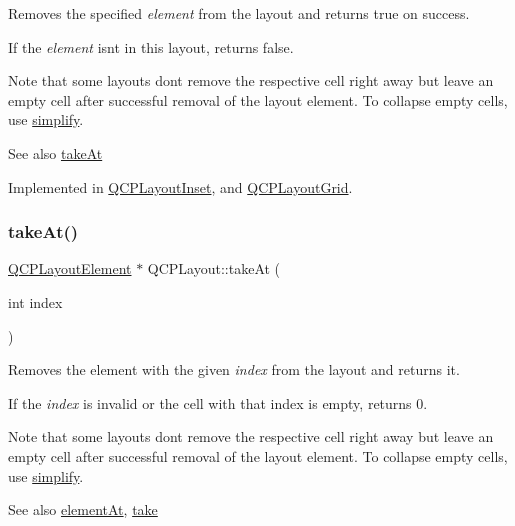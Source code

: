 Removes the specified {\itshape element} from the layout and returns true on success.

If the {\itshape element} isn\textquotesingle{}t in this layout, returns false.

Note that some layouts don\textquotesingle{}t remove the respective cell right away but leave an empty cell after successful removal of the layout element. To collapse empty cells, use \hyperlink{class_q_c_p_layout_a41e6ac049143866e8f8b4964efab01b2}{simplify}.

\begin{DoxySeeAlso}{See also}
\hyperlink{class_q_c_p_layout_a5a79621fa0a6eabb8b520cfc04fb601a}{take\+At} 
\end{DoxySeeAlso}


Implemented in \hyperlink{class_q_c_p_layout_inset_a9ac707ccff650633b97f52dd5cddcf49}{Q\+C\+P\+Layout\+Inset}, and \hyperlink{class_q_c_p_layout_grid_a666a9fe9e92054436f9b66eba25cca0c}{Q\+C\+P\+Layout\+Grid}.

\mbox{\label{class_q_c_p_layout_a5a79621fa0a6eabb8b520cfc04fb601a}} 
\subsubsection{\texorpdfstring{take\+At()}{takeAt()}}
{\footnotesize\ttfamily \hyperlink{class_q_c_p_layout_element}{Q\+C\+P\+Layout\+Element} $\ast$ Q\+C\+P\+Layout\+::take\+At (\begin{DoxyParamCaption}\item[{int}]{index }\end{DoxyParamCaption})\hspace{0.3cm}{\ttfamily [pure virtual]}}

Removes the element with the given {\itshape index} from the layout and returns it.

If the {\itshape index} is invalid or the cell with that index is empty, returns 0.

Note that some layouts don\textquotesingle{}t remove the respective cell right away but leave an empty cell after successful removal of the layout element. To collapse empty cells, use \hyperlink{class_q_c_p_layout_a41e6ac049143866e8f8b4964efab01b2}{simplify}.

\begin{DoxySeeAlso}{See also}
\hyperlink{class_q_c_p_layout_afa73ca7d859f8a3ee5c73c9b353d2a56}{element\+At}, \hyperlink{class_q_c_p_layout_ada26cd17e56472b0b4d7fbbc96873e4c}{take} 
\end{DoxySeeAlso}


